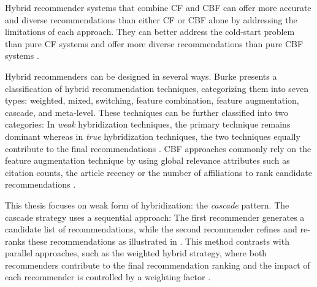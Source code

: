Hybrid recommender systems that combine \ac{CF} and \ac{CBF} can offer more accurate and diverse recommendations than either \ac{CF} or \ac{CBF} alone by addressing the limitations of each approach.
They can better address the cold-start problem than pure \ac{CF} systems and offer more diverse recommendations than pure \ac{CBF} systems \cite{BurkeHybridRecommender2002}.

Hybrid recommenders can be designed in several ways. Burke \cite{BurkeHybridRecommender2002} presents a classification of hybrid recommendation techniques, categorizing them into seven types: weighted, mixed, switching, feature combination, feature augmentation, cascade, and meta-level.
These techniques can be further classified into two categories: In \emph{weak} hybridization techniques, the primary technique remains dominant whereas in \emph{true} hybridization techniques, the two techniques equally contribute to the final recommendations \cite{BreitingerAcademicLiterature2023,BurkeHybridRecommender2002,BurkeHybridWeb2007}.
\ac{CBF} approaches commonly rely on the feature augmentation technique by using global relevance attributes such as citation counts, the article recency or the number of affiliations to rank candidate recommendations \cite{BreitingerAcademicLiterature2023}.

This thesis focuses on weak form of hybridization: the \emph{cascade} pattern. The cascade strategy uses a sequential approach: The first recommender generates a candidate list of recommendations, while the second recommender refines and re-ranks these recommendations \cite{BurkeHybridRecommender2002,chiangTypesHybrid2021} as illustrated in .
This method contrasts with parallel approaches, such as the weighted hybrid strategy, where both recommenders contribute to the final recommendation ranking and the impact of each recommender is controlled by a weighting factor \cite{BurkeHybridRecommender2002}.

